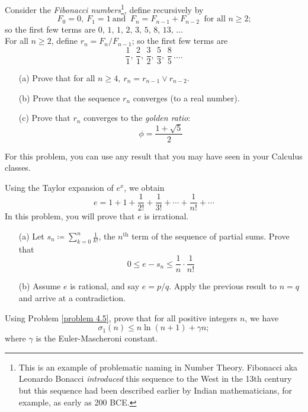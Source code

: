 \begin{problem}\label{Problem 6.2}
Consider the \emph{Fibonacci numbers}\footnote{This is an example of problematic naming in Number Theory. Fibonacci aka Leonardo Bonacci \emph{introduced} this sequence to the West in the 13th century but this sequence had been described earlier by Indian mathematicians, for example, as early as 200 BCE.}, define recursively by
\[F_0 = 0,\ F_1 = 1\ \text {and }\ F_n = F_{n-1} + F_{n-2}\ \text{ for all $n\geq 2$;}\]
so the first few terms are $0,\,1,\,1,\,2,\,3,\,5,\,8,\,13,\,\ldots$\\[0.5em]
For all $n\geq 2$, define $r_n = F_n/F_{n-1}$; so the first few terms are
\[\frac{1}{1},\,\frac{2}{1},\,\frac{3}{2},\,\frac{5}{3},\,\frac{8}{5}\,\ldots.\]
\begin{itemize}
\item[(a)] Prove that for all $n\geq 4,\ r_n = r_{n-1} \vee r_{n-2}$.
\item[(b)] Prove that the sequence $r_n$ converges (to a real number).
\item[(c)] Prove that $r_n$ converges to the \emph{golden ratio}:
\[\phi = \frac{1 + \sqrt{5}}{2}\]
\end{itemize}
For this problem, you can use any result that you may have seen in your Calculus classes.
\end{problem}


\begin{problem}\label{Problem 6.3}
Using the Taylor expansion of $e^x$, we obtain
\[e = 1 + 1 + \frac{1}{2!} + \frac{1}{3!} + \cdots + \frac{1}{n!} + \cdots\]
In this problem, you will prove that $e$ is irrational.
\begin{itemize}
\item[(a)] Let $\displaystyle s_n \coloneqq \sum_{k=0}^n \frac{1}{k!}$, the $n^{\text{th}}$ term of the sequence of partial sums. Prove that
\[0 \leq e - s_n \leq \frac{1}{n}\cdot \frac{1}{n!}\]
\item[(b)] Assume $e$ is rational, and say $e = p/q$. Apply the previous result to $n = q$ and arrive at a contradiction.
\end{itemize}
\end{problem}

\vspace*{0.1in}

\begin{problem}\label{Problem 6.4}
Using Problem \ref{problem 4.5}, prove that for all positive integers $n$, we have
\[\sigma_1(n) \leq n \ln(n+1) + \gamma n;\]
where $\gamma$ is the Euler-Mascheroni constant.
\end{problem}